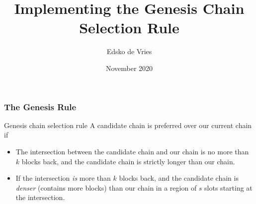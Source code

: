 \documentclass[usenames,dvipsnames,t]{beamer}
\title{Implementing the Genesis Chain Selection Rule}
\author{Edsko de Vries}
\institute{Well-Typed}
\date{November 2020}
\begin{document}
\frame{\titlepage}


\begin{frame}
\frametitle{The Genesis Rule}

\begin{alertblock}{Genesis chain selection rule}
A candidate chain is preferred over our current chain if

\begin{itemize}
\item The intersection between the candidate chain and our chain is no more
than $k$ blocks back, and the candidate chain is strictly longer than our
chain.

\item If the intersection \emph{is} more than $k$ blocks back, and the
candidate chain is \emph{denser} (contains more blocks) than our chain in
a region of $s$ slots starting at the intersection.
\end{itemize}
\end{alertblock}

\end{frame}

\end{document}
